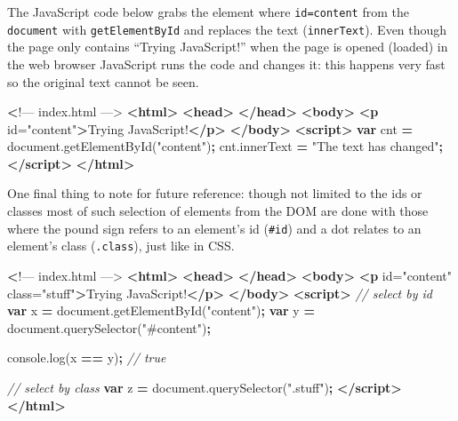 \documentclass[10pt,]{krantz}
\makeatletter
\newenvironment{Shaded}{\begin{snugshade}}{\end{snugshade}}
\newcommand{\AttributeTok}[1]{\textcolor[rgb]{0.61,0.61,0.61}{#1}}
\newcommand{\CommentTok}[1]{\textcolor[rgb]{0.37,0.37,0.37}{\textit{#1}}}
\newcommand{\ErrorTok}[1]{\textcolor[rgb]{0.14,0.14,0.14}{\textbf{#1}}}
\newcommand{\KeywordTok}[1]{\textcolor[rgb]{0.27,0.27,0.27}{\textbf{#1}}}
\newcommand{\NormalTok}[1]{#1}
\newcommand{\OperatorTok}[1]{\textcolor[rgb]{0.43,0.43,0.43}{\textbf{#1}}}
\newcommand{\OtherTok}[1]{\textcolor[rgb]{0.37,0.37,0.37}{#1}}
\newcommand{\StringTok}[1]{\textcolor[rgb]{0.5,0.5,0.5}{#1}}
\newcommand{\VariableTok}[1]{\textcolor[rgb]{0,0,0}{#1}}
\newenvironment{kframe}{%
\medskip{}
\setlength{\fboxsep}{.8em}
 \def\at@end@of@kframe{}%
 \ifinner\ifhmode%
  \def\at@end@of@kframe{\end{minipage}}%
  \begin{minipage}{\columnwidth}%
 \fi\fi%
 \def\FrameCommand##1{\hskip\@totalleftmargin \hskip-\fboxsep
 \colorbox{shadecolor}{##1}\hskip-\fboxsep
     \hskip-\linewidth \hskip-\@totalleftmargin \hskip\columnwidth}%
 \MakeFramed {\advance\hsize-\width
   \@totalleftmargin\z@ \linewidth\hsize
   \@setminipage}}%
 {\par\unskip\endMakeFramed%
 \at@end@of@kframe}
\renewenvironment{Shaded}{\begin{kframe}}{\end{kframe}}
\makeatother
\begin{document}
The JavaScript code below grabs the element where \texttt{id=\textquotesingle{}content\textquotesingle{}} from the \texttt{document} with \texttt{getElementById} and replaces the text (\texttt{innerText}). Even though the page only contains ``Trying JavaScript!'' when the page is opened (loaded) in the web browser JavaScript runs the code and changes it: this happens very fast so the original text cannot be seen.

\begin{Shaded}
\begin{Highlighting}[]
 \ErrorTok{<}\NormalTok{!–– index.html ––>}
\KeywordTok{<html>}
  \KeywordTok{<head>}
  \KeywordTok{</head>}
  \KeywordTok{<body>}
    \KeywordTok{<p}\OtherTok{ id=}\StringTok{"content"}\KeywordTok{>}\NormalTok{Trying JavaScript!}\KeywordTok{</p>}
  \KeywordTok{</body>}
  \KeywordTok{<script>}
    \KeywordTok{var}\NormalTok{ cnt }\OperatorTok{=} \VariableTok{document}\NormalTok{.}\AttributeTok{getElementById}\NormalTok{(}\StringTok{"content"}\NormalTok{)}\OperatorTok{;}
    \VariableTok{cnt}\NormalTok{.}\AttributeTok{innerText} \OperatorTok{=} \StringTok{"The text has changed"}\OperatorTok{;}
  \KeywordTok{</script>}
\KeywordTok{</html>}
\end{Highlighting}
\end{Shaded}

One final thing to note for future reference: though not limited to the ids or classes most of such selection of elements from the DOM are done with those where the pound sign refers to an element's id (\texttt{\#id}) and a dot relates to an element's class (\texttt{.class}), just like in CSS.

\begin{Shaded}
\begin{Highlighting}[]
 \ErrorTok{<}\NormalTok{!–– index.html ––>}
\KeywordTok{<html>}
  \KeywordTok{<head>}
  \KeywordTok{</head>}
  \KeywordTok{<body>}
    \KeywordTok{<p}\OtherTok{ id=}\StringTok{"content"}\OtherTok{ class=}\StringTok{"stuff"}\KeywordTok{>}\NormalTok{Trying JavaScript!}\KeywordTok{</p>}
  \KeywordTok{</body>}
  \KeywordTok{<script>}
    \CommentTok{// select by id}
    \KeywordTok{var}\NormalTok{ x }\OperatorTok{=} \VariableTok{document}\NormalTok{.}\AttributeTok{getElementById}\NormalTok{(}\StringTok{"content"}\NormalTok{)}\OperatorTok{;}
    \KeywordTok{var}\NormalTok{ y }\OperatorTok{=} \VariableTok{document}\NormalTok{.}\AttributeTok{querySelector}\NormalTok{(}\StringTok{"#content"}\NormalTok{)}\OperatorTok{;}

    \VariableTok{console}\NormalTok{.}\AttributeTok{log}\NormalTok{(x }\OperatorTok{==}\NormalTok{ y)}\OperatorTok{;} \CommentTok{// true}

    \CommentTok{// select by class}
    \KeywordTok{var}\NormalTok{ z }\OperatorTok{=} \VariableTok{document}\NormalTok{.}\AttributeTok{querySelector}\NormalTok{(}\StringTok{".stuff"}\NormalTok{)}\OperatorTok{;}
  \KeywordTok{</script>}
\KeywordTok{</html>}
\end{Highlighting}
\end{Shaded}
\end{document}
